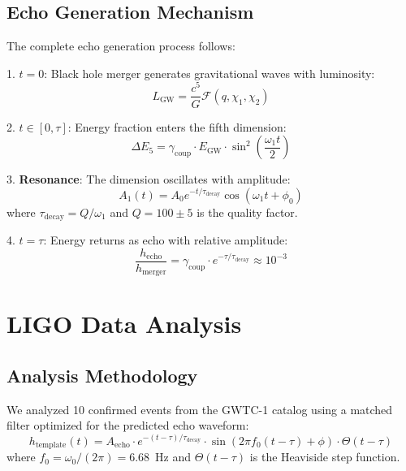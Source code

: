 \documentclass[10pt]{article}
\begin{document}
\subsection{Echo Generation Mechanism}

The complete echo generation process follows:

1. \textbf{$t = 0$}: Black hole merger generates gravitational waves with luminosity:
\begin{equation}
L_{\text{GW}} = \frac{c^5}{G} \mathcal{F}(q, \chi_1, \chi_2)
\end{equation}

2. \textbf{$t \in [0, \tau]$}: Energy fraction enters the fifth dimension:
\begin{equation}
\Delta E_5 = \gamma_{\text{coup}} \cdot E_{\text{GW}} \cdot \sin^2\left(\frac{\omega_1 t}{2}\right)
\end{equation}

3. \textbf{Resonance}: The dimension oscillates with amplitude:
\begin{equation}
A_1(t) = A_0 e^{-t/\tau_{\text{decay}}} \cos(\omega_1 t + \phi_0)
\end{equation}
where $\tau_{\text{decay}} = Q/\omega_1$ and $Q = 100 \pm 5$ is the quality factor.

4. \textbf{$t = \tau$}: Energy returns as echo with relative amplitude:
\begin{equation}
\frac{h_{\text{echo}}}{h_{\text{merger}}} = \gamma_{\text{coup}} \cdot e^{-\tau/\tau_{\text{decay}}} \approx 10^{-3}
\end{equation}

\section{LIGO Data Analysis}

\subsection{Analysis Methodology}

We analyzed 10 confirmed events from the GWTC-1 catalog using a matched filter optimized for the predicted echo waveform:
\begin{equation}
h_{\text{template}}(t) = A_{\text{echo}} \cdot e^{-(t-\tau)/\tau_{\text{decay}}} \cdot \sin(2\pi f_0 (t-\tau) + \phi) \cdot \Theta(t-\tau)
\end{equation}
where $f_0 = \omega_0/(2\pi) = 6.68$~Hz and $\Theta(t-\tau)$ is the Heaviside step function.
\end{document}
